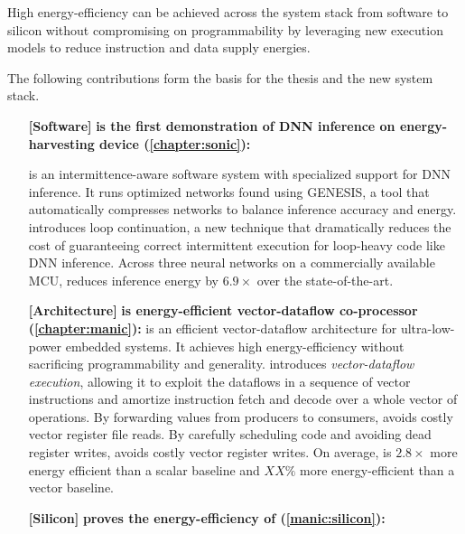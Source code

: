 \begin{adjustwidth}{1cm}{1cm}
High energy-efficiency can be achieved 
across the system stack from software to silicon without compromising on programmability by leveraging new execution models to reduce instruction and data supply energies.
% 

\end{adjustwidth}
% 
The following contributions form the basis for the thesis and the new system stack.

\begin{itemize}

\item[\textbf{[Software]}]
\textbf{\sonic is the first demonstration of DNN inference on energy-harvesting device (\autoref{chapter:sonic}): }

\sonic is an intermittence-aware software system with specialized support for DNN inference. 
% 
It runs optimized networks found using GENESIS, a tool that automatically compresses networks to balance inference accuracy and energy.
% 
\sonic introduces loop continuation, a new technique that dramatically reduces the cost of guaranteeing correct intermittent execution for loop-heavy code like DNN inference. 
% 
Across three neural networks on a commercially available MCU, \sonic reduces inference energy by $6.9\times$ over the state-of-the-art.

\item[\textbf{[Architecture]}]
\textbf{\manic is energy-efficient vector-dataflow co-processor (\autoref{chapter:manic}): }
\manic is an efficient vector-dataflow architecture for ultra-low-power embedded systems.  
% 
It achieves high energy-efficiency without sacrificing programmability and generality.
% 
\manic introduces \emph{vector-dataflow execution}, allowing it to exploit the
dataflows in a sequence of vector instructions and amortize instruction
fetch and decode over a whole vector of operations.
%
By forwarding values from producers to consumers, \manic avoids costly vector register file reads.
% 
By carefully scheduling code and avoiding dead register writes, \manic avoids costly vector register writes.
% 
On average, \manic is $2.8\times$ more energy efficient than a scalar baseline and $XX\%$ more energy-efficient than a vector baseline.

\item[\textbf{[Silicon]}]
\textbf{\manicsilicon proves the energy-efficiency of \manic (\autoref{manic:silicon}): }


\end{itemize}
